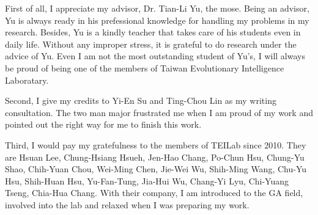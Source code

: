 \begin{acknowledgementsEN}

\noindent
First of all, I appreciate my advisor, Dr. Tian-Li Yu, the mose. Being
an advisor, Yu is always ready in his prefessional knowledge for
handling my problems in my research.
Besides, Yu is a kindly teacher that takes care of his students even in
daily life.
Without any improper stress, it is grateful to do research under the
advice of Yu.
Even I am not the most outstanding student of Yu's, I will always
be proud of being one of the members of Taiwan Evolutionary Intelligence
Laboratary.

Second, I give my credits to Yi-En Su and Ting-Chou Lin as my writing
consultation.
The two man major frustrated me when I am proud of my work and pointed
out the right way for me to finish this work.

Third, I would pay my gratefulness to the members of TEILab since 2010.
They are
Hsuan Lee, Chung-Hsiang Hsueh, Jen-Hao Chang,
Po-Chun Hsu, Chung-Yu Shao, Chih-Yuan Chou, Wei-Ming Chen,
Jie-Wei Wu, Shih-Ming Wang, Chu-Yu Hsu,
Shih-Huan Hsu, Yu-Fan-Tung, Jia-Hui Wu,
Chang-Yi Lyu, Chi-Yuang Tseng, Chia-Hua Chang.
With their company, I am introduced to the GA field, involved into the
lab and relaxed when I was preparing my work.


\end{acknowledgementsEN}
